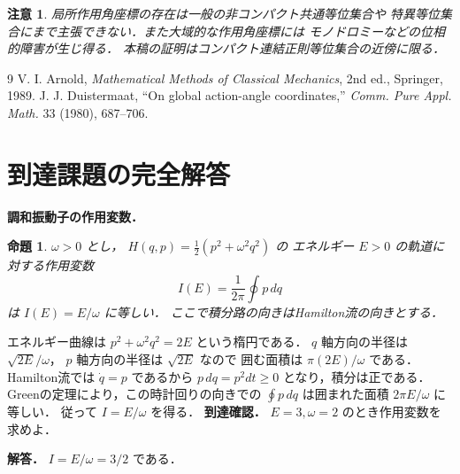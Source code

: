 \documentclass[a5paper,10pt,onecolumn]{jsarticle}
\makeatletter
\theoremstyle{mathnotetheorem}
\newtheorem{proposition}[theorem]{命題}
\newtheorem{remark}[theorem]{注意}
\renewcommand{\proofname}{証明}
\renewenvironment{proof}[1][\proofname]{%
  \par\pushQED{\qed}\normalfont\topsep4\p@\@plus2\p@\relax
  \trivlist\item[\hskip\labelsep\bfseries #1]\ignorespaces
}{\popQED\endtrivlist\@endpefalse}
\makeatother
\begin{document}
\begin{remark}
局所作用角座標の存在は一般の非コンパクト共通等位集合や
特異等位集合にまで主張できない．また大域的な作用角座標には
モノドロミーなどの位相的障害が生じ得る．
本稿の証明はコンパクト連結正則等位集合の\emph{近傍}に限る．
\end{remark}

\begin{thebibliography}{9}
 V. I. Arnold,
 \emph{Mathematical Methods of Classical Mechanics},
 2nd ed., Springer, 1989.
 J. J. Duistermaat,
 ``On global action-angle coordinates,''
 \emph{Comm. Pure Appl. Math.} 33 (1980), 687--706.
\end{thebibliography}

\section{到達課題の完全解答}
\noindent\textbf{調和振動子の作用変数．}
\begin{proposition}
$\omega>0$ とし，
$H(q,p)=\frac12(p^2+\omega^2q^2)$ の
エネルギー $E>0$ の軌道に対する作用変数
\[
I(E)=\frac1{2\pi}\oint p\,dq
\]
は $I(E)=E/\omega$ に等しい．
ここで積分路の向きはHamilton流の向きとする．
\end{proposition}
\begin{proof}
エネルギー曲線は
$p^2+\omega^2q^2=2E$ という楕円である．
$q$ 軸方向の半径は $\sqrt{2E}/\omega$，
$p$ 軸方向の半径は $\sqrt{2E}$ なので
囲む面積は $\pi(2E)/\omega$ である．
Hamilton流では $\dot q=p$ であるから
$p\,dq=p^2dt\ge0$ となり，積分は正である．
Greenの定理により，この時計回りの向きでの
$\oint p\,dq$ は囲まれた面積 $2\pi E/\omega$ に等しい．
従って $I=E/\omega$ を得る．
\end{proof}
\noindent\textbf{到達確認．}
$E=3,\omega=2$ のとき作用変数を求めよ．
\par\noindent\textbf{解答．}
$I=E/\omega=3/2$ である．
\end{document}
